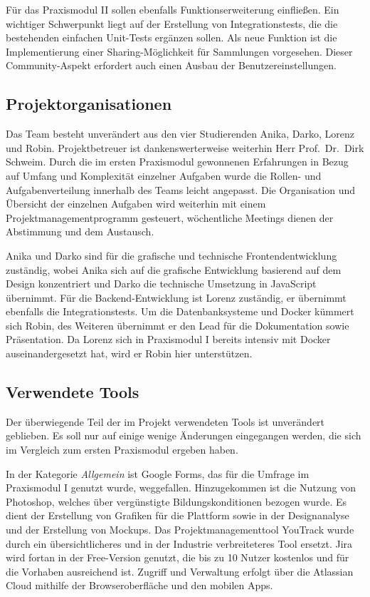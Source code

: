 Für das Praxismodul II sollen ebenfalls Funktionserweiterung einfließen.
Ein wichtiger Schwerpunkt liegt auf der Erstellung von Integrationstests, die die bestehenden einfachen Unit-Tests ergänzen sollen.
Als neue Funktion ist die Implementierung einer Sharing-Möglichkeit für Sammlungen vorgesehen.
Dieser Community-Aspekt erfordert auch einen Ausbau der Benutzereinstellungen.


\subsection{Projektorganisationen}\label{subsec:subsection-one-three}

Das Team besteht unverändert aus den vier Studierenden Anika, Darko, Lorenz und Robin.
Projektbetreuer ist dankenswerterweise weiterhin Herr Prof.\, Dr.\, Dirk Schweim.
Durch die im ersten Praxismodul gewonnenen Erfahrungen in Bezug auf Umfang und Komplexität einzelner Aufgaben wurde die Rollen- und Aufgabenverteilung innerhalb des Teams leicht angepasst.
Die Organisation und Übersicht der einzelnen Aufgaben wird weiterhin mit einem Projektmanagementprogramm gesteuert, wöchentliche Meetings dienen der Abstimmung und dem Austausch.

Anika und Darko sind für die grafische und technische Frontendentwicklung zuständig, wobei Anika sich auf die grafische Entwicklung basierend auf dem Design konzentriert und Darko die technische Umsetzung in JavaScript übernimmt.
Für die Backend-Entwicklung ist Lorenz zuständig, er übernimmt ebenfalls die Integrationstests.
Um die Datenbanksysteme und Docker kümmert sich Robin, des Weiteren übernimmt er den Lead für die Dokumentation sowie Präsentation.
Da Lorenz sich in Praxismodul I bereits intensiv mit Docker auseinandergesetzt hat, wird er Robin hier unterstützen.


\subsection{Verwendete Tools}\label{subsec:subsection-one-four}

Der überwiegende Teil der im Projekt verwendeten Tools ist unverändert geblieben.
Es soll nur auf einige wenige Änderungen eingegangen werden, die sich im Vergleich zum ersten Praxismodul ergeben haben.

In der Kategorie \textit{Allgemein} ist Google Forms, das für die Umfrage im Praxismodul I genutzt wurde, weggefallen.
Hinzugekommen ist die Nutzung von Photoshop, welches über vergünstigte Bildungskonditionen bezogen wurde.
Es dient der Erstellung von Grafiken für die Plattform sowie in der Designanalyse und der Erstellung von Mockups.
Das Projektmanagementtool YouTrack wurde durch ein übersichtlicheres und in der Industrie verbreiteteres Tool ersetzt.
Jira wird fortan in der Free-Version genutzt, die bis zu 10 Nutzer kostenlos und für die Vorhaben ausreichend ist.
Zugriff und Verwaltung erfolgt über die Atlassian Cloud mithilfe der Browseroberfläche und den mobilen Apps.

